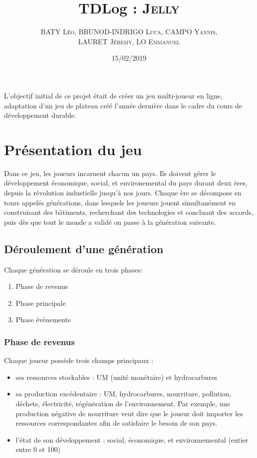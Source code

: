 \documentclass[12pt,twoside,a4paper]{article}
\title{TDLog : \textsc{Jelly}}
\author{\textsc{BATY L\'eo, BRUNOD-INDRIGO Luca, CAMPO Yannis,}\\ \textsc{LAURET J\'eremy, LO Emmanuel}}
\date{15/02/2019}
\begin{document}
\maketitle

\tableofcontents

\newpage%

L'objectif initial de ce projet \'etait de cr\'eer un jeu multi-joueur en ligne, adaptation d'un jeu de plateau cr\'e\'e l'ann\'ee derni\`ere dans le cadre du cours de d\'eveloppement durable. 

\section{Pr\'esentation du jeu}

Dans ce jeu, les joueurs incarnent chacun un pays. Ils doivent g\'erer le d\'eveloppement \'economique, social, et environemental du pays durant deux \`eres, depuis la r\'evolution industielle jusqu'\`a nos jours. Chaque \`ere se d\'ecompose en tours appel\'es g\'en\'erations, dans lesquels les joueurs jouent simultan\'ement en construisant des b\^atiments, recherchant des technologies et concluant des accords, puis d\`es que tout le monde a valid\'e on passe \`a la g\'en\'eration suivante.\\


\subsection{D\'eroulement d'une g\'en\'eration}
\noindent Chaque g\'en\'eration se d\'eroule en trois phases:

\begin{enumerate}
\item Phase de revenus
\item Phase principale
\item Phase \'ev\`enements
\end{enumerate}

\subsubsection{Phase de revenus}

Chaque joueur poss\`ede trois champs principaux :
\begin{itemize}
\item ses ressources stockables : UM (unit\'e mon\'etaire) et hydrocarbures
\item sa production exc\'edentaire : UM, hydrocarbures, nourriture, pollution, d\'echets, \'electricit\'e, r\'eg\'en\'eration de l'environnement. Par exemple, une production n\'egative de nourriture veut dire que le joueur doit importer les ressources correspondantes afin de satisfaire le besoin de son pays.
\item l'\'etat de son d\'eveloppement : social, \'economique, et environnemental (entier entre 0 et 100)\\
\end{itemize}
\end{document}
